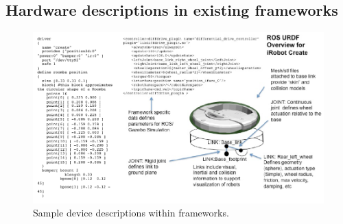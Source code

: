 \subsection{Hardware descriptions in existing frameworks}

\begin{figure}[thpb]
      \centering
      \includegraphics[width=5in]{URDFPS.pdf}
      \caption{Sample device descriptions within frameworks.}
      \label{psurdf}
\end{figure}



